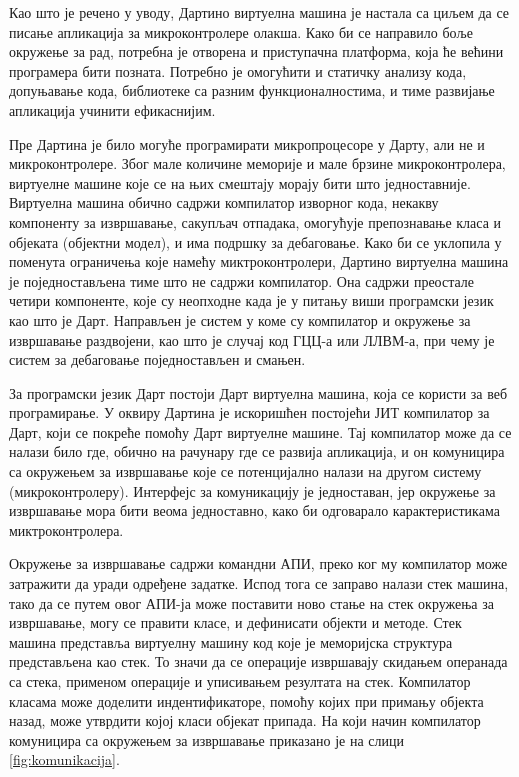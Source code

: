 \documentclass[12pt,oneside]{memoir}
\begin{document}
Као што је речено у уводу, Дартино виртуелна машина је настала са циљем да се писање апликација за микроконтролере олакша. Како би се направило боље окружење за рад, потребна је отворена и приступачна платформа, која ће већини програмера бити позната. Потребно је омогућити и статичку анализу кода, допуњавање кода, библиотеке са разним функционалностима, и тиме развијање апликација учинити ефикаснијим.

Пре Дартина је било могуће програмирати микропроцесоре у Дарту, али не и микроконтролере. Због мале количине меморије и мале брзине микроконтролера, виртуелне машине које се на њих смештају морају бити што једноставније. Виртуелна машина обично садржи компилатор изворног кода, некакву компоненту за извршавање, сакупљач отпадака, омогућује препознавање класа и објеката (објектни модел), и има подршку за дебаговање. Како би се уклопила у поменута ограничења које намећу миктроконтролери, Дартино виртуелна машина је поједностављена тиме што не садржи компилатор. Она садржи преостале четири компоненте, које су неопходне када је у питању виши програмски језик као што је Дарт. Направљен је систем у коме су компилатор и окружење за извршавање раздвојени, као што је случај код ГЦЦ-а или ЛЛВМ-а, при чему је систем за дебаговање поједностављен и смањен.\cite{Dartino}

За програмски језик Дарт постоји Дарт виртуелна машина, која се користи за веб програмирање. У оквиру Дартина је искоришћен постојећи ЈИТ компилатор за Дарт, који се покреће помоћу Дарт виртуелне машине. Тај компилатор може да се налази било где, обично на рачунару где се развија апликација, и он комуницира са окружењем за извршавање које се потенцијално налази на другом систему (микроконтролеру). Интерфејс за комуникацију је једноставан, јер окружење за извршавање мора бити веома једноставно, како би одговарало карактеристикама миктроконтролера.

Окружење за извршавање садржи командни АПИ, преко ког му компилатор може затражити да уради одређене задатке. Испод тога се заправо налази стек машина, тако да се путем овог АПИ-ја може поставити ново стање на стек окружења за извршавање, могу се правити класе, и дефинисати објекти и методе. Стек машина представља виртуелну машину код које је меморијска структура представљена као стек. То значи да се операције извршавају скидањем операнада са стека, применом операције и уписивањем резултата на стек. Компилатор класама може доделити индентификаторе, помоћу којих при примању објекта назад, може утврдити којој класи објекат припада. \cite{Dartino}На који начин компилатор комуницира са окружењем за извршавање приказано је на слици \ref{fig:komunikacija}.
\end{document}
